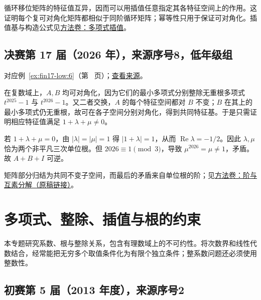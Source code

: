 \documentclass[12pt,fontset=fandol]{ctexart}
\begin{document}
\begin{remark}[方法与条件]

循环移位矩阵的特征值互异，因而可以用插值任意指定其各特征空间上的作用。这证明每个复可对角化矩阵都相似于同阶循环矩阵；幂等性只用于保证可对角化。插值基与构造公式见\hyperref[app:algebra-interpolation]{方法卷：多项式插值}。

\end{remark}

\subsection{决赛第 17 届（2026 年），来源序号8，低年级组}\label{ans:fin17-low:6}\label{pr:fin17-low:6}

对应例~\ref{ex:fin17-low:6}（第~\pageref{ex:fin17-low:6} 页）；\href{https://github.com/lzxcr/cmc-mathematics/blob/64916fa1fdbc3e444a652eca204d5669058ee321/src/problems/finals/17/08.md}{查看来源}。

\begin{solve}

在复数域上，$A,B$ 均可对角化，因为它们的最小多项式分别整除无重根多项式 $t^{2025}-1$ 与 $t^{2026}-1$。又二者交换，$A$ 的每个特征空间都对 $B$ 不变；$B$ 在其上的最小多项式仍无重根，故可在各子空间分别对角化，得到共同特征基。于是只需证明相应特征值满足 $1+\lambda+\mu\ne0$。

若 $1+\lambda+\mu=0$，由 $|\lambda|=|\mu|=1$ 得 $|1+\lambda|=1$，从而 $\operatorname{Re}\lambda=-1/2$。因此 $\lambda,\mu$ 恰为两个非平凡三次单位根。但 $2026\equiv1\pmod3$，导致 $\mu^{2026}=\mu\ne1$，矛盾。故 $A+B+I$ 可逆。

矩阵部分归结为共同不变子空间，而最后的矛盾来自单位根的阶；见\href{https://github.com/lzxcr/cmc-mathematics/blob/64916fa1fdbc3e444a652eca204d5669058ee321/src/methods/outer/01-algebra.md}{方法卷：阶与互素分解（原稿链接）}。

\end{solve}

\section{多项式、整除、插值与根的约束}

\label{sec:solutions-4}

本专题研究系数、根与整除关系，包含有理数域上的不可约性。将次数界和线性代数结合，经常能把无穷多个取值条件化为有限个独立条件；整系数问题还必须使用整数性。

\subsection{初赛第 5 届（2013 年度），来源序号2}\label{ans:pre05-math:2}\label{pr:pre05-math:2}
\end{document}
